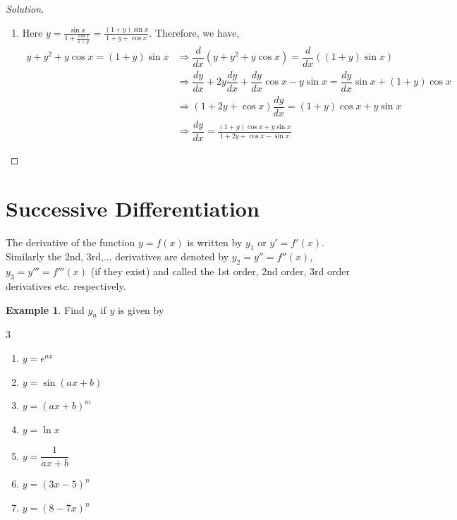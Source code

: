 \documentclass[../../main.tex]{subfiles}
\theoremstyle{definition}
\newtheorem{example}{Example}[section]
\newenvironment{solution}
    {\begin{proof}[Solution]}
    {\end{proof}}
\begin{document}
\begin{solution}
\begin{enumerate}[label=(\roman*)]
\item Here $y=\frac{\sin x}{1+\frac{\cos x}{1+y}}=\frac{(1+y)\sin x}{1+y+\cos x}$. Therefore, we have,
\begin{align*}
y+y^2+y\cos x=(1+y)\sin x &\Rightarrow \dfrac{d}{dx}(y+y^2+y\cos x)=\dfrac{d}{dx}((1+y)\sin x) \\
& \Rightarrow \dfrac{dy}{dx}+2y\dfrac{dy}{dx}+\dfrac{dy}{dx}\cos x-y\sin x=\dfrac{dy}{dx}\sin x+(1+y)\cos x \\
&\Rightarrow (1+2y+\cos x)\dfrac{dy}{dx}=(1+y)\cos x+y\sin x \\
&\Rightarrow \dfrac{dy}{dx}= \frac{(1+y)\cos x+y\sin x}{1+2y+\cos x-\sin x}
\end{align*}
\end{enumerate}
\end{solution}


\section{Successive Differentiation}

The derivative of the function $y=f(x)$ is written by $y_1$ or $y' =f'(x)$. Similarly the 2nd, 3rd,... derivatives are denoted by $y_2 =y'' =f'' (x)$, $ y_3 = y''' = f'''(x)$ (if they exist) and called the 1st order, 2nd order, 3rd order derivatives etc. respectively.

\begin{example}
Find $y_n$ if $y$ is given by
\begin{multicols}{3}
\begin{enumerate}[label=(\roman*)]
    \item $y=e^{ax}$
    \item $y=\sin (ax+b)$
    \item $y=(ax+b)^m$
    \item $y=\ln x$ 
    \item $y=\dfrac{1}{ax+b}$
    \item $y=(3x-5)^n$
    \item $y=(8-7x)^n$
\end{enumerate}
\end{multicols}    
\end{example}
\end{document}
